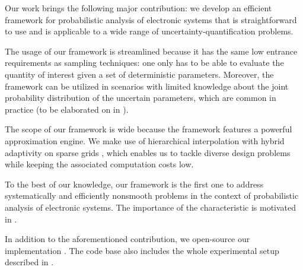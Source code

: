 Our work brings the following major contribution: we develop an efficient
framework for probabilistic analysis of electronic systems that is
straightforward to use and is applicable to a wide range of
uncertainty-quantification problems.

The usage of our framework is streamlined because it has the same low entrance
requirements as sampling techniques: one only has to be able to evaluate the
quantity of interest given a set of deterministic parameters. Moreover, the
framework can be utilized in scenarios with limited knowledge about the joint
probability distribution of the uncertain parameters, which are common in
practice (to be elaborated on in ).

The scope of our framework is wide because the framework features a powerful
approximation engine. We make use of hierarchical interpolation with hybrid
adaptivity on sparse grids \cite{jakeman2012, klimke2006, ma2009}, which enables
us to tackle diverse design problems while keeping the associated computation
costs low.

To the best of our knowledge, our framework is the first one to address
systematically and efficiently nonsmooth problems in the context of
probabilistic analysis of electronic systems. The importance of the
characteristic is motivated in .

In addition to the aforementioned contribution, we open-source our
implementation \cite{sources}. The code base also includes the whole
experimental setup described in .
